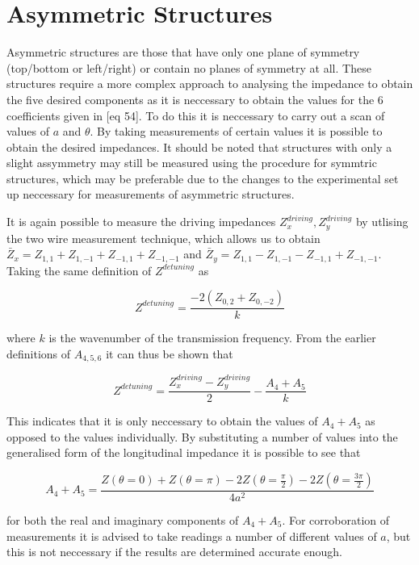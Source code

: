 \section{Asymmetric Structures}

Asymmetric structures are those that have only one plane of symmetry (top/bottom or left/right) or contain no planes of symmetry at all. These structures require a more complex approach to analysing the impedance to obtain the five desired components as it is neccessary to obtain the values for the 6 coefficients given in [eq 54]. To do this it is neccessary to carry out a scan of values of $a$ and $\theta$. By taking measurements of certain values it is possible to obtain the desired impedances. It should be noted that structures with only a slight assymmetry may still be measured using the procedure for symmtric structures, which may be preferable due to the changes to the experimental set up neccessary for measurements of asymmetric structures.

It is again possible to measure the driving impedances $Z_{x}^{driving},Z_{y}^{driving}$ by utlising the two wire measurement technique, which allows us to obtain $\bar{Z}_{x} = Z_{1,1} + Z_{1,-1} + Z_{-1,1} + Z_{-1,-1}$ and $ \bar{Z}_{y} = Z_{1,1} - Z_{1,-1} - Z_{-1,1} + Z_{-1,-1}$. Taking the same definition of $Z^{detuning}$ as

\begin{equation}
Z^{detuning} = \frac{-2\left(Z_{0,2} + Z_{0,-2}\right)}{k}
\end{equation}

where $k$ is the wavenumber of the transmission frequency. From the earlier definitions of $A_{4,5,6}$ it can thus be shown that

\begin{equation}
Z^{detuning} = \frac{Z_{x}^{driving} - Z_{y}^{driving}}{2} - \frac{A_{4} + A_{5}}{k}
\end{equation}

This indicates that it is only neccessary to obtain the values of $A_{4} + A_{5}$ as opposed to the values individually. By substituting a number of values into the generalised form of the longitudinal impedance it is possible to see that

\begin{equation}
A_{4} + A_{5} = \frac{Z(\theta = 0) + Z(\theta = \pi) - 2Z\left(\theta = \frac{\pi}{2}\right) - 2Z\left(\theta = \frac{3\pi}{2} \right)} {4a^{2}}
\end{equation}

for both the real and imaginary components of $A_{4} + A_{5}$. For corroboration of measurements it is advised to take readings a number of different values of $a$, but this is not neccessary if the results are determined accurate enough.